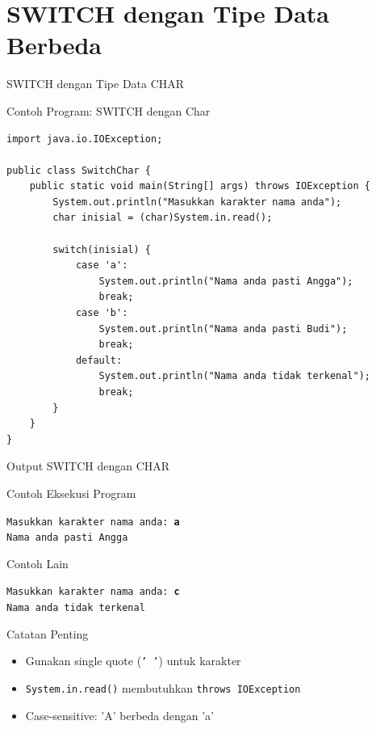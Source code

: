 \documentclass{beamer}
\begin{document}
\section{SWITCH dengan Tipe Data Berbeda}
\begin{frame}[fragile]{SWITCH dengan Tipe Data CHAR}
  \begin{exampleblock}{Contoh Program: SWITCH dengan Char}
    \begin{lstlisting}
import java.io.IOException;

public class SwitchChar {
    public static void main(String[] args) throws IOException {
        System.out.println("Masukkan karakter nama anda");
        char inisial = (char)System.in.read();
        
        switch(inisial) {
            case 'a': 
                System.out.println("Nama anda pasti Angga");
                break;
            case 'b': 
                System.out.println("Nama anda pasti Budi");
                break;
            default: 
                System.out.println("Nama anda tidak terkenal");
                break;
        }
    }
}
    \end{lstlisting}
  \end{exampleblock}
\end{frame}

\begin{frame}{Output SWITCH dengan CHAR}
\begin{block}{Contoh Eksekusi Program}
\colorbox{gray!20}{
    \parbox{0.9\textwidth}{
        \texttt{Masukkan karakter nama anda: \textbf{a}\\
        Nama anda pasti Angga}
    }
}
\end{block}

\begin{block}{Contoh Lain}
\colorbox{gray!20}{
    \parbox{0.9\textwidth}{
        \texttt{Masukkan karakter nama anda: \textbf{c}\\
        Nama anda tidak terkenal}
    }
}
\end{block}

\begin{block}{Catatan Penting}
\begin{itemize}
\item Gunakan single quote (\texttt{' '}) untuk karakter
\item \texttt{System.in.read()} membutuhkan \texttt{throws IOException}
\item Case-sensitive: 'A' berbeda dengan 'a'
\end{itemize}
\end{block}
\end{frame}
\end{document}

